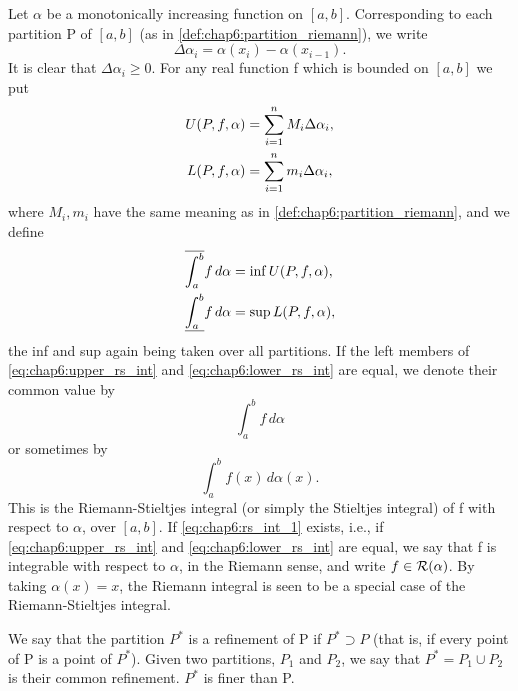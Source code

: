 \begin{definition} %
  \label{def:chap6:rs_integral}
  Let $\alpha$ be a monotonically increasing function on $[a, b]$.
  Corresponding to each partition P of $[a, b]$ (as in
  \autoref{def:chap6:partition_riemann}), we write
  \[ \Delta \alpha_i = \alpha(x_i) - \alpha(x_{i-1}). \]
  It is clear that $\Delta \alpha_i \ge 0$. For any real function f
  which is bounded on $[a, b]$ we put
  \begin{align*}
    U(P, f, \alpha) &= \sum_{i=1}^n M_i \Delta \alpha_i, \\
    L(P, f, \alpha) &= \sum_{i=1}^n m_i \Delta \alpha_i,
  \end{align*}
  where $M_i, m_i$ have the same meaning as in
  \autoref{def:chap6:partition_riemann}, and we define
  \begin{align}
    \overline{\int_{a}^{b}} f \, d\alpha &= \inf U(P, f, \alpha),
    \label{eq:chap6:upper_rs_int} \\
    \underline{\int_{a}^{b}} f \, d\alpha &= \sup
    L(P, f, \alpha), \label{eq:chap6:lower_rs_int}
  \end{align}
  the inf and sup again being taken over all partitions. If the left
  members of \eqref{eq:chap6:upper_rs_int} and
  \eqref{eq:chap6:lower_rs_int} are equal, we denote their common value by
  \begin{equation} \label{eq:chap6:rs_int_1}
    \int_{a}^{b} f \, d\alpha
  \end{equation}
  or sometimes by
  \begin{equation} \label{eq:chap6:rs_int_2}
    \int_{a}^{b} f(x) \, d\alpha(x).
  \end{equation}
  This is the Riemann-Stieltjes integral (or simply the Stieltjes
  integral) of f with respect to $\alpha$, over $[a, b]$. If
  \eqref{eq:chap6:rs_int_1} exists, i.e., if
  \eqref{eq:chap6:upper_rs_int} and \eqref{eq:chap6:lower_rs_int} are
  equal, we say that f is integrable with respect to $\alpha$, in the
  Riemann sense, and write $f \in \mathcal{R}(\alpha)$.
  By taking $\alpha(x) = x$, the Riemann integral is seen to be a
  special case of the Riemann-Stieltjes integral.
\end{definition}

\begin{definition}[Refinement] %
  \label{def:chap6:refinement}
  We say that the partition $P^*$ is a refinement of P if $P^*
  \supset P$ (that is, if every point of P is a point of $P^*$).
  Given two partitions, $P_1$ and $P_2$, we say that $P^* = P_1 \cup
  P_2$ is their common refinement. $P^*$ is finer than P.
\end{definition}

